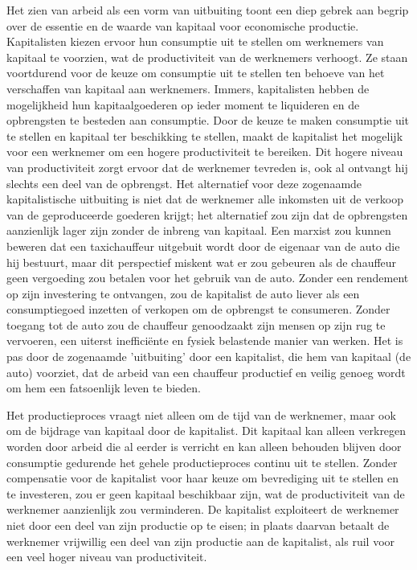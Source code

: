 Het zien van arbeid als een vorm van uitbuiting toont een diep gebrek aan begrip over de essentie en de waarde van kapitaal voor economische productie. Kapitalisten kiezen ervoor hun consumptie uit te stellen om werknemers van kapitaal te voorzien, wat de productiviteit van de werknemers verhoogt. Ze staan voortdurend voor de keuze om consumptie uit te stellen ten behoeve van het verschaffen van kapitaal aan werknemers. Immers, kapitalisten hebben de mogelijkheid hun kapitaalgoederen op ieder moment te liquideren en de opbrengsten te besteden aan consumptie. Door de keuze te maken consumptie uit te stellen en kapitaal ter beschikking te stellen, maakt de kapitalist het mogelijk voor een werknemer om een hogere productiviteit te bereiken. Dit hogere niveau van productiviteit zorgt ervoor dat de werknemer tevreden is, ook al ontvangt hij slechts een deel van de opbrengst. Het alternatief voor deze zogenaamde kapitalistische uitbuiting is niet dat de werknemer alle inkomsten uit de verkoop van de geproduceerde goederen krijgt; het alternatief zou zijn dat de opbrengsten aanzienlijk lager zijn zonder de inbreng van kapitaal. Een marxist zou kunnen beweren dat een taxichauffeur uitgebuit wordt door de eigenaar van de auto die hij bestuurt, maar dit perspectief miskent wat er zou gebeuren als de chauffeur geen vergoeding zou betalen voor het gebruik van de auto. Zonder een rendement op zijn investering te ontvangen, zou de kapitalist de auto liever als een consumptiegoed inzetten of verkopen om de opbrengst te consumeren. Zonder toegang tot de auto zou de chauffeur genoodzaakt zijn mensen op zijn rug te vervoeren, een uiterst inefficiënte en fysiek belastende manier van werken. Het is pas door de zogenaamde 'uitbuiting' door een kapitalist, die hem van kapitaal (de auto) voorziet, dat de arbeid van een chauffeur productief en veilig genoeg wordt om hem een fatsoenlijk leven te bieden.

Het productieproces vraagt niet alleen om de tijd van de werknemer, maar ook om de bijdrage van kapitaal door de kapitalist. Dit kapitaal kan alleen verkregen worden door arbeid die al eerder is verricht en kan alleen behouden blijven door consumptie gedurende het gehele productieproces continu uit te stellen. Zonder compensatie voor de kapitalist voor haar keuze om bevrediging uit te stellen en te investeren, zou er geen kapitaal beschikbaar zijn, wat de productiviteit van de werknemer aanzienlijk zou verminderen. De kapitalist exploiteert de werknemer niet door een deel van zijn productie op te eisen; in plaats daarvan betaalt de werknemer vrijwillig een deel van zijn productie aan de kapitalist, als ruil voor een veel hoger niveau van productiviteit.

